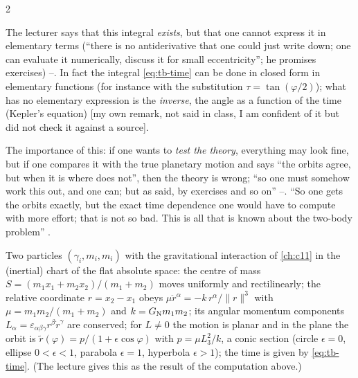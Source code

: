 \begin{paracol}{2}
\begin{coursenote}\label{cn:tb-integral}
The lecturer says that this integral \emph{exists}, but that one cannot express it in elementary terms (``there is no antiderivative that one could just write down; one can evaluate it numerically, discuss it for small eccentricity''; he promises exercises) --. In fact the integral \eqref{eq:tb-time} can be done in closed form in elementary functions (for instance with the substitution $\tau=\tan(\varphi/2)$);
what has no elementary expression is the \emph{inverse}, the angle as a function of the time (Kepler's equation) [my own remark, not said in class, I am confident of it but did not check it against a source].
\end{coursenote}
The importance of this: if one wants to \emph{test the theory}, everything may look fine, but if one compares it with the true planetary motion and says ``the orbits agree, but when it is where does not'', then the theory is wrong; ``so one must somehow work this out, and one can; but as said, by exercises and so on'' --. ``So one gets the orbits exactly, but the exact time dependence one would have to compute with more effort; that is not so bad. This is all that is known about the two-body problem'' .

\begin{theorem}\label{thm:tb-summary}
Two particles $(\gamma_i,m_i,m_i)$ with the gravitational interaction of \cref{ch:c11} in the (inertial) chart of the flat absolute space: the centre of mass $S=(m_1x_1+m_2x_2)/(m_1+m_2)$ moves uniformly and rectilinearly; the relative coordinate $r=x_2-x_1$ obeys $\mu\ddot r^\alpha=-k\,r^\alpha/\|r\|^3$ with $\mu=m_1m_2/(m_1+m_2)$ and $k=G_{\rm N}m_1m_2$; its angular momentum components $L_\alpha=\varepsilon_{\alpha\beta\gamma}r^\beta\dot r^\gamma$ are conserved; for $L\neq0$ the motion is planar and in the plane the orbit is $\tilde r(\varphi)=p/(1+\epsilon\cos\varphi)$ with $p=\mu L_3^2/k$,
a conic section (circle $\epsilon=0$, ellipse $0<\epsilon<1$, parabola $\epsilon=1$, hyperbola $\epsilon>1$); the time is given by \eqref{eq:tb-time}. (The lecture gives this as the result of the computation above.)
\end{theorem}


\end{paracol}
